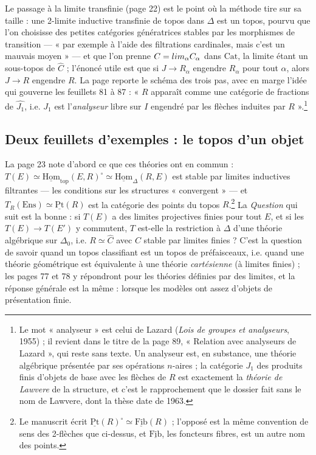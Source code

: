 \documentclass[11pt,a4paper]{article}
\begin{document}
Le passage à la limite transfinie (page 22) est le point où la méthode
tire sur sa taille : une 2-limite inductive transfinie de topos dans
$\Delta$ est un topos, pourvu que l'on choisisse des petites catégories
génératrices stables par les morphismes de transition — « par exemple à
l'aide des filtrations cardinales, mais c'est un mauvais moyen » — et que
l'on prenne $C = \varinjlim_{\alpha} C_{\alpha}$ dans $\mathrm{Cat}$, la
limite étant un sous-topos de $\widehat{C}$ ; l'énoncé utile est que si
$J \to R_{\alpha}$ engendre $R_{\alpha}$ pour tout $\alpha$, alors $J \to R$
engendre $R$. La page reporte le schéma des trois pas, avec en marge l'idée
qui gouverne les feuillets 81 à 87 : « $R$ apparaît comme une catégorie de
fractions de $\widehat{J_{1}}$, i.e. $J_{1}$ est l'\emph{analyseur} libre
sur $I$ engendré par les flèches induites par $R$ ».\footnote{Le mot
« analyseur » est celui de Lazard (\emph{Lois de groupes et analyseurs},
1955) ; il revient dans le titre de la page 89, « Relation avec analyseurs
de Lazard », qui reste sans texte. Un analyseur est, en substance, une
théorie algébrique présentée par ses opérations $n$-aires ; la catégorie
$J_{1}$ des produits finis d'objets de base avec les flèches de $R$ est
exactement la \emph{théorie de Lawvere} de la structure, et c'est le
rapprochement que le dossier fait sans le nom de Lawvere, dont la thèse
date de 1963.}

\subsection*{Deux feuillets d'exemples : le topos d'un objet}

La page 23 note d'abord ce que ces théories ont en commun : $T(E) \simeq
\underline{\mathrm{Hom}}_{\mathrm{top}}(E, R)^{\circ} \simeq
\underline{\mathrm{Hom}}_{\Delta}(R, E)$ est stable par limites inductives
filtrantes — les conditions sur les structures « convergent » — et
$T_{R}(\mathrm{Ens}) \simeq \underline{\mathrm{Pt}}(R)$ est la catégorie des
points du topos $R$.\footnote{Le manuscrit écrit $\underline{\mathrm{Pt}}
(R)^{\circ} \simeq \underline{\mathrm{Fib}}(R)$ ; l'opposé est la même
convention de sens des 2-flèches que ci-dessus, et $\underline{\mathrm{Fib}}$,
les foncteurs fibres, est un autre nom des points.} La \emph{Question} qui
suit est la bonne : si $T(E)$ a des limites projectives finies pour tout
$E$, et si les $T(E) \to T(E')$ y commutent, $T$ est-elle la restriction à
$\Delta$ d'une théorie algébrique sur $\Delta_{0}$, i.e. $R \simeq
\widehat{C}$ avec $C$ stable par limites finies ? C'est la question de
savoir quand un topos classifiant est un topos de préfaisceaux, i.e. quand
une théorie géométrique est équivalente à une théorie \emph{cartésienne}
(à limites finies) ; les pages 77 et 78 y répondront pour les théories
définies par des limites, et la réponse générale est la même : lorsque les
modèles ont assez d'objets de présentation finie.
\end{document}
